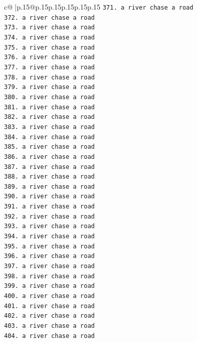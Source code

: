 \documentclass{article}
\begin{document}
{\begin{supertabular}{c@{$\;$}|p{.15\linewidth}@{}p{.15\linewidth}p{.15\linewidth}p{.15\linewidth}p{.15\linewidth}p{.15\linewidth}}
{{{\texttt{371. a river chase a road} \\
\texttt{372. a river chase a road} \\
\texttt{373. a river chase a road} \\
\texttt{374. a river chase a road} \\
\texttt{375. a river chase a road} \\
\texttt{376. a river chase a road} \\
\texttt{377. a river chase a road} \\
\texttt{378. a river chase a road} \\
\texttt{379. a river chase a road} \\
\texttt{380. a river chase a road} \\
\texttt{381. a river chase a road} \\
\texttt{382. a river chase a road} \\
\texttt{383. a river chase a road} \\
\texttt{384. a river chase a road} \\
\texttt{385. a river chase a road} \\
\texttt{386. a river chase a road} \\
\texttt{387. a river chase a road} \\
\texttt{388. a river chase a road} \\
\texttt{389. a river chase a road} \\
\texttt{390. a river chase a road} \\
\texttt{391. a river chase a road} \\
\texttt{392. a river chase a road} \\
\texttt{393. a river chase a road} \\
\texttt{394. a river chase a road} \\
\texttt{395. a river chase a road} \\
\texttt{396. a river chase a road} \\
\texttt{397. a river chase a road} \\
\texttt{398. a river chase a road} \\
\texttt{399. a river chase a road} \\
\texttt{400. a river chase a road} \\
\texttt{401. a river chase a road} \\
\texttt{402. a river chase a road} \\
\texttt{403. a river chase a road} \\
\texttt{404. a river chase a road} \\
}}}
\end{supertabular}}
\end{document}
